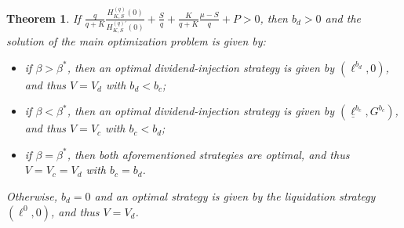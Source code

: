 \documentclass[11pt,reqno]{amsart}
\newtheorem{theorem}{Theorem}[section]
\newcommand{\Hq}{H^{(q)}_{K,S}}
\newcommand{\Hqprime}{H^{(q) \prime}_{K,S}}
\newcommand{\ettaz}{\frac{S}{q} + \frac{K}{q+K}\frac{\mu - S}{q}}
\begin{document}
\begin{theorem}\label{thm:sol-main}
If $\frac{q}{q+K}\frac{\Hq(0)}{\Hqprime(0)} + \ettaz + P > 0$, then $b_d>0$ and the solution of the main optimization problem is given by:
    \begin{itemize}
        \item if $\beta > \beta^*$, then an optimal dividend-injection strategy is given by $(\ell^{b_d}, 0)$, and thus $V = V_d$ with $b_d < b_c$;
        \item if $\beta < \beta^*$, then an optimal dividend-injection strategy is given by $(\underline \ell^{b_c}, G^{b_c})$, and thus $V = V_c$ with $b_c < b_d$;
        \item if $\beta = \beta^*$, then both aforementioned strategies are optimal, and thus $V=V_c=V_d$ with $b_c=b_d$.
    \end{itemize}
Otherwise, $b_d=0$ and an optimal strategy is given by the \textit{liquidation strategy} $(\ell^0, 0)$, and thus $V = V_d$.
\end{theorem}
\end{document}
